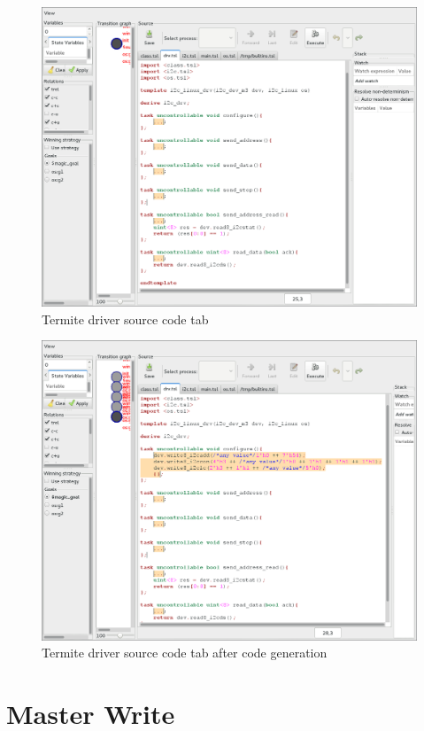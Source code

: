 \begin{figure}
    \center
    \includegraphics[width=\linewidth]{imgs/screenshot_1.png}
    \caption{Termite driver source code tab}
    \label{fig:driver_tab}
\end{figure}

\begin{figure}
    \center
    \includegraphics[width=\linewidth]{imgs/screenshot_2.png}
    \caption{Termite driver source code tab after code generation}
    \label{fig:driver_tab_gen}
\end{figure}

\section{Master Write}
\label{a:sec_master_write}

